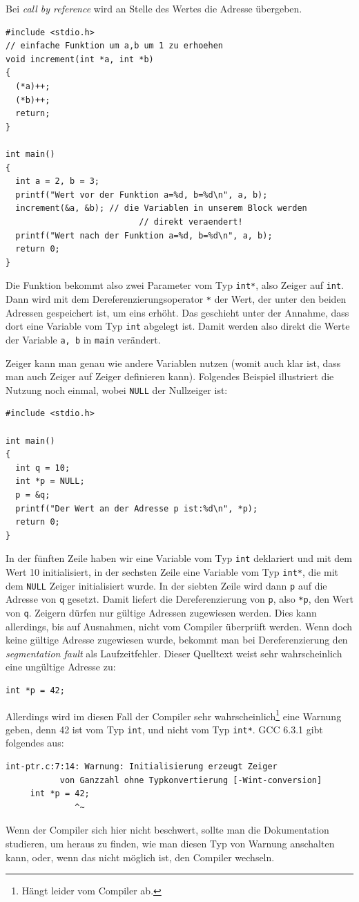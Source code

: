 Bei \emph{call by reference} wird an Stelle des Wertes die Adresse übergeben.
\begin{lstlisting}
#include <stdio.h>
// einfache Funktion um a,b um 1 zu erhoehen
void increment(int *a, int *b)
{
  (*a)++;
  (*b)++;
  return;
}

int main()
{
  int a = 2, b = 3;
  printf("Wert vor der Funktion a=%d, b=%d\n", a, b);
  increment(&a, &b); // die Variablen in unserem Block werden
                           // direkt veraendert!
  printf("Wert nach der Funktion a=%d, b=%d\n", a, b);
  return 0;
}
\end{lstlisting}
Die Funktion bekommt also zwei Parameter vom Typ \verb|int*|, also Zeiger auf \verb|int|.
Dann wird mit dem Dereferenzierungsoperator \verb|*| der Wert, der unter den beiden Adressen gespeichert ist, um eins erhöht.
Das geschieht unter der Annahme, dass dort eine Variable vom Typ \verb|int| abgelegt ist.
Damit werden also direkt die Werte der Variable \verb|a, b| in \verb|main| verändert.

Zeiger kann man genau wie andere Variablen nutzen (womit auch klar ist, dass man auch Zeiger auf Zeiger definieren kann).
Folgendes Beispiel illustriert die Nutzung noch einmal, wobei \verb|NULL| der Nullzeiger ist:
\begin{lstlisting}
#include <stdio.h>

int main()
{
  int q = 10;
  int *p = NULL;
  p = &q;
  printf("Der Wert an der Adresse p ist:%d\n", *p);
  return 0;
}
\end{lstlisting}
In der fünften Zeile haben wir eine Variable vom Typ \verb|int| deklariert und mit dem Wert 10 initialisiert, in der sechsten Zeile eine Variable vom Typ \verb|int*|, die mit dem \verb|NULL| Zeiger initialisiert wurde.
In der siebten Zeile wird dann \verb|p| auf die Adresse von \verb|q| gesetzt.
Damit liefert die Dereferenzierung von \verb|p|, also \verb|*p|, den Wert von \verb|q|.
Zeigern dürfen nur gültige Adressen zugewiesen werden.
Dies kann allerdings, bis auf Ausnahmen, nicht vom Compiler überprüft werden.
Wenn doch keine gültige Adresse zugewiesen wurde, bekommt man bei Dereferenzierung den \emph{segmentation fault} als Laufzeitfehler.
Dieser Quelltext weist sehr wahrscheinlich eine ungültige Adresse zu:
\begin{lstlisting}
int *p = 42;
\end{lstlisting}
Allerdings wird im diesen Fall der Compiler sehr wahrscheinlich\footnote{Hängt leider vom Compiler ab.} eine Warnung geben, denn 42 ist vom Typ \verb|int|, und nicht vom Typ \verb|int*|.
GCC 6.3.1 gibt folgendes aus:
\begin{verbatim}
int-ptr.c:7:14: Warnung: Initialisierung erzeugt Zeiger 
           von Ganzzahl ohne Typkonvertierung [-Wint-conversion]
     int *p = 42;
              ^~
\end{verbatim}
Wenn der Compiler sich hier nicht beschwert, sollte man die Dokumentation studieren, um heraus zu finden, wie man diesen Typ von Warnung anschalten kann, oder, wenn das nicht möglich ist, den Compiler wechseln.

